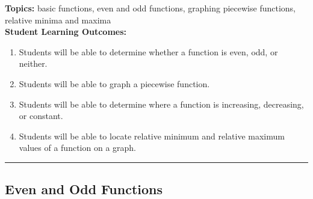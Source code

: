 

\noindent \textbf{Topics:}  basic functions, even and odd functions, graphing piecewise functions, relative minima and maxima\\

\noindent \textbf{Student Learning Outcomes:}
\begin{enumerate}
\item Students will be able to determine whether a function is even, odd, or neither.
\item Students will be able to graph a piecewise function.
\item Students will be able to determine where a function is increasing, decreasing, or constant.
\item  Students will be able to locate relative minimum and relative maximum values of a function on a graph.
\end{enumerate}

\hrule 

\bigskip

\subsection{Even and Odd Functions} ~



\noindent
{}

\noindent
{}



